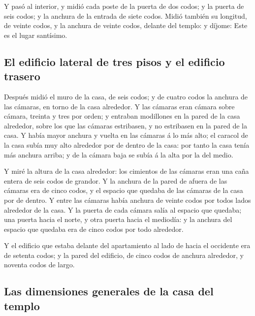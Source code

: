  Y pasó al interior, y midió cada poste de la puerta de
dos codos; y la puerta de seis codos; y la anchura de la entrada de
siete codos.  Midió también su longitud, de veinte codos,
y la anchura de veinte codos, delante del templo: y díjome: Este es el
lugar santísimo.

\hypertarget{el-edificio-lateral-de-tres-pisos-y-el-edificio-trasero}{%
\subsection{El edificio lateral de tres pisos y el edificio
trasero}\label{el-edificio-lateral-de-tres-pisos-y-el-edificio-trasero}}

 Después midió el muro de la casa, de seis codos; y de
cuatro codos la anchura de las cámaras, en torno de la casa alrededor.
 Y las cámaras eran cámara sobre cámara, treinta y tres
por orden; y entraban modillones en la pared de la casa alrededor, sobre
los que las cámaras estribasen, y no estribasen en la pared de la casa.
 Y había mayor anchura y vuelta en las cámaras á lo más
alto; el caracol de la casa subía muy alto alrededor por de dentro de la
casa: por tanto la casa tenía más anchura arriba; y de la cámara baja se
subía á la alta por la del medio.

 Y miré la altura de la casa alrededor: los cimientos de
las cámaras eran una caña entera de seis codos de grandor.
 Y la anchura de la pared de afuera de las cámaras era de
cinco codos, y el espacio que quedaba de las cámaras de la casa por de
dentro.  Y entre las cámaras había anchura de veinte
codos por todos lados alrededor de la casa.  Y la puerta
de cada cámara salía al espacio que quedaba; una puerta hacia el norte,
y otra puerta hacia el mediodía: y la anchura del espacio que quedaba
era de cinco codos por todo alrededor.

 Y el edificio que estaba delante del apartamiento al
lado de hacia el occidente era de setenta codos; y la pared del
edificio, de cinco codos de anchura alrededor, y noventa codos de largo.

\hypertarget{las-dimensiones-generales-de-la-casa-del-templo}{%
\subsection{Las dimensiones generales de la casa del
templo}\label{las-dimensiones-generales-de-la-casa-del-templo}}

